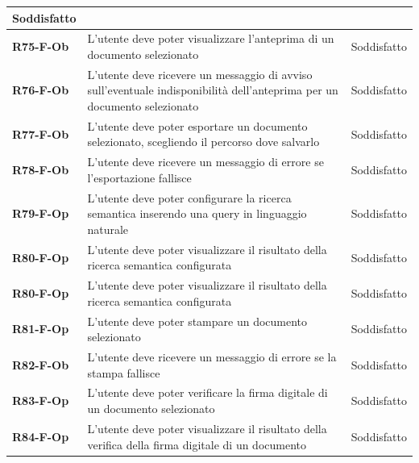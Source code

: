 \documentclass[a4paper,12pt]{article}
\begin{document}
{{\begin{longtable}{|>{\centering\arraybackslash}m{}|>{\centering\arraybackslash}m{}|>{\centering\arraybackslash}m{}|}
                Soddisfatto \\ 
                \hline
                \textbf{R75-F-Ob} & L'utente deve poter visualizzare l'anteprima di un documento selezionato & 
                Soddisfatto \\ 
                \hline
                \textbf{R76-F-Ob} & L'utente deve ricevere un messaggio di avviso sull'eventuale indisponibilità dell'anteprima per un documento selezionato & 
                Soddisfatto \\ 
                \hline
                \textbf{R77-F-Ob} & L'utente deve poter esportare un documento selezionato, scegliendo il percorso dove salvarlo & 
                Soddisfatto \\ 
                \hline
                \textbf{R78-F-Ob} & L'utente deve ricevere un messaggio di errore se l'esportazione fallisce & 
                Soddisfatto \\ 
                \hline
                \textbf{R79-F-Op} & L'utente deve poter configurare la ricerca semantica inserendo una query in linguaggio naturale & 
                Soddisfatto \\ 
                \hline
                \textbf{R80-F-Op} & L'utente deve poter visualizzare il risultato della ricerca semantica configurata & 
                Soddisfatto \\ 
                \hline
                \hline
                \textbf{R80-F-Op} & L'utente deve poter visualizzare il risultato della ricerca semantica configurata & 
                Soddisfatto \\ 
                \hline
                \textbf{R81-F-Op} & L'utente deve poter stampare un documento selezionato & 
                Soddisfatto \\ 
                \hline
                \textbf{R82-F-Ob} & L'utente deve ricevere un messaggio di errore se la stampa fallisce & 
                Soddisfatto \\ 
                \hline
                \textbf{R83-F-Op} & L'utente deve poter verificare la firma digitale di un documento selezionato & 
                Soddisfatto \\ 
                \hline
                \textbf{R84-F-Op} & L'utente deve poter visualizzare il risultato della verifica della firma digitale di un documento & 
                Soddisfatto \\ 
                \hline
            \end{longtable}
        }
}
\end{document}
